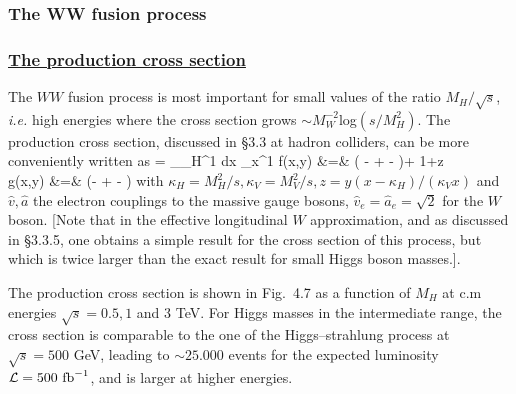 \subsubsection{The WW fusion process} 

\subsubsection*{\underline{The production cross section}}

The $WW$ fusion process 
\cite{VVH-Cahn,VVH-DW,VVH-Hikasa,VVH-Altarelli,VVH-Kilian,Petcov}
is most important for  small values of the ratio $M_H/\sqrt{s}$, {\it i.e.} 
high energies where the cross  section grows $\sim M_W^{-2}$log$(s/M_H^2)$.  
The production cross section, discussed in \S3.3  at hadron colliders, can be 
more conveniently written as 
\beq 
\sigma=  \int_{\kappa_H}^1 {\rm d}x
\int_x^1   \label{WWxsection} 
\eeq 
\vspace*{-6mm}
\beq 
f(x,y) &=& \left( - +
- \right)
+ {1+z} \non \\ 
g(x,y) &=& \left(- + - \right) 
\non 
\eeq 
with $\kappa_H =M_H^2/s, \kappa_V=M_V^2/s , z=y(x-\kappa_H)/(\kappa_Vx)$ and 
$\hat{v}, \hat{a}$ the electron couplings to the massive gauge bosons, $\hat{v
}_e=\hat{a}_e=\sqrt{2}$ for  the $W$ boson. [Note that in the effective 
longitudinal $W$ approximation, and as discussed in \S3.3.5, one obtains a 
simple result for the cross section of this process, but  which is
twice larger than the exact result for small Higgs boson masses.].\s

The production cross section is shown in Fig.~4.7 as a function of $M_H$ at c.m
energies $\sqrt{s}=0.5, 1$ and 3 TeV. For Higgs masses in the intermediate
range, the cross section is comparable to the one of the Higgs--strahlung
process at $\sqrt{s}=500$ GeV, leading to $\sim 25.000$ events for the expected
luminosity ${\cal L} =500 \ {\rm fb}^{-1}$, and is larger at higher energies.  

\begin{figure}[!h]
\begin{center}
\vspace*{-1.cm}
\hspace*{-1.cm}
\end{center}
\vspace*{-16.4cm}
\vspace*{-.5cm}
\end{figure}

